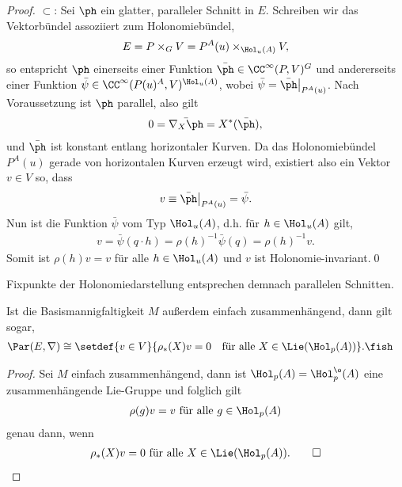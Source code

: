 \documentclass[%
	paper=a5,%
	fleqn,%
	DIV=18,%
	BCOR=0mm,
	fontsize=11pt,
	titlepage=false,%
	bibliography=totoc,
	DIV=18,%
	twoside=true,
	pdftitle=Riemannsche Geometrie,
	pdfauthor=Uwe Semmelmann,
	numbers=noendperiod]%
	{scrbook}
\begin{document}
\begin{proof}
$\subset$: Sei $\ph$ ein glatter, paralleler Schnitt in $E$. Schreiben wir das Vektorbündel assoziiert zum Holonomiebündel,
\begin{align*}
E = P\times_{G} V = P^A(u) \times_{\Hol_{u}(A)}V,
\end{align*}
so entspricht $\ph$ einerseits einer Funktion $\bar{\ph} \in\CC^\infty(P,V)^G$ und andererseits einer Funktion $\bar{\psi}\in \CC^\infty(P(u)^A,V)^{\Hol_{u}(A)}$, wobei $\bar{\psi} = \bar{\ph}\big|_{P^A(u)}$. Nach Voraussetzung ist $\ph$ parallel, also gilt
\begin{align*}
0 = \bar{\nabla_{X}\ph} = X^*(\bar{\ph}),
\end{align*}
und $\bar{\ph}$ ist konstant entlang horizontaler Kurven. Da das Holonomiebündel $P^A(u)$ gerade von horizontalen Kurven erzeugt wird, existiert also ein Vektor $v\in V$ so, dass
\begin{align*}
v \equiv \bar{\ph}\big|_{P^A(u)} = \bar{\psi}.
\end{align*}
Nun ist die Funktion $\bar{\psi}$ vom Typ $\Hol_{u}(A)$, d.h. für $h\in\Hol_{u}(A)$ gilt,
\begin{align*}
v = \bar{\psi}(q\cdot h) = \rho(h)^{-1}\bar{\psi}(q) = \rho(h)^{-1}v.
\end{align*}
Somit ist $\rho(h)v = v$ für alle $h\in \Hol_{u}(A)$ und $v$ ist Holonomie-invariant.\qed
\end{proof}

Fixpunkte der Holonomiedarstellung entsprechen demnach parallelen Schnitten.

\begin{prop}[Zusatz]
Ist die Basismannigfaltigkeit $M$ außerdem einfach zusammenhängend, dann gilt sogar,
\begin{align*}
\Par(E,\nabla) &\cong \setdef{v\in V}{\rho_{*}(X)v = 0\quad \text{für alle }X\in \Lie(\Hol_{p}(A))}.\fish
\end{align*}
\end{prop}
\begin{proof}
Sei $M$ einfach zusammenhängend, dann ist $\Hol_{p}(A) = \Hol_{p}^\o(A)$ eine zusammenhängende Lie-Gruppe und folglich gilt
\begin{align*}
\rho(g)v = v \text{ für alle } g\in \Hol_{p}(A)
\end{align*}
genau dann, wenn
\begin{align*}
\rho_{*}(X)v = 0\text{ für alle } X\in \Lie(\Hol_{p}(A)).\qed
\end{align*}
\end{proof}
\end{document}
